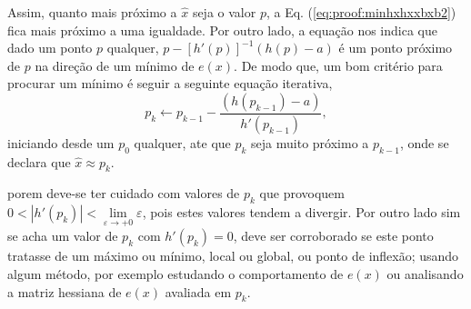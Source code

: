 \begin{myproofT}
Assim, quanto mais próximo a $\hat{x}$ seja  o valor $p$, 
a Eq. (\ref{eq:proof:minhxhxxbxb2}) fica mais próximo a uma igualdade. Por outro lado,
a equação nos indica que dado um ponto  $p$ qualquer,
$p - \left[ h'(p) \right]^{-1}\left(h(p)-a\right)$
é um ponto próximo de $p$  na direção de um mínimo de $e(x)$.
De modo que, um bom critério para procurar um mínimo é seguir a seguinte 
equação iterativa,
\begin{equation}\label{eq:proof:minhxhxxbxb3}
p_{k} \leftarrow p_{k-1} - \frac{ \left(h(p_{k-1})-a\right)}{h'(p_{k-1})},
\end{equation}
iniciando desde um $p_{0}$ qualquer, ate que $p_{k}$ seja muito próximo a $p_{k-1}$,
onde se declara que $\hat{x} \approx p_{k}$. 


porem deve-se ter cuidado com valores de $p_{k}$ que provoquem 
$0<|h'(p_{k})|<\lim\limits_{\varepsilon \rightarrow +0}\varepsilon$,
pois estes valores tendem a divergir. Por outro lado sim se acha um valor 
de $p_{k}$ com $h'(p_{k})= 0$, deve ser
corroborado se este ponto tratasse de um máximo ou mínimo, local ou global, ou ponto de inflexão;
usando algum método, por exemplo estudando o comportamento 
de $e(x)$ ou analisando a matriz hessiana de $e(x)$ avaliada em $p_{k}$.

\end{myproofT}
